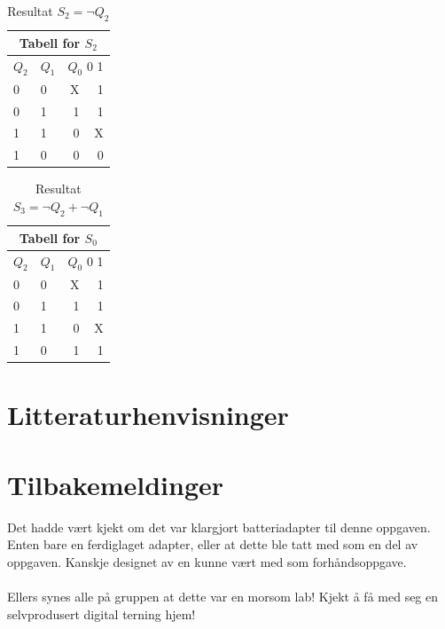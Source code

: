 \documentclass[12pt,norsk,a4paper]{article}
\begin{document}
    \begin{table}[H]
    \begin{center}
    \begin{tabular}{|l|l|r|r|} \hline
    \multicolumn{4}{|c|}{Tabell for $S_2$} \\ \hline
    $Q_2$ & $Q_1$ & \multicolumn{2}{|r|}{$Q_0$ \hspace{20 mm} 0 \hspace{2 mm} 1} \\ \hline
    0 & 0 & \hspace{27 mm} X \cellcolor[gray]{0.8} & \cellcolor[gray]{0.8} 1 \\ \hline 
    0 & 1 & 1 \cellcolor[gray]{0.8} & 1 \cellcolor[gray]{0.8} \\ \hline
    1 & 1 & 0 & X \\ \hline
    1 & 0 & 0 & 0 \\ \hline
    \end{tabular}
    \end{center}
    \caption{Resultat $S_2=\neg Q_2$}
    \end{table}

    \begin{table}[H]
    \begin{center}
    \begin{tabular}{|l|l|r|r|} \hline
    \multicolumn{4}{|c|}{Tabell for $S_0$} \\ \hline
    $Q_2$ & $Q_1$ & \multicolumn{2}{|r|}{$Q_0$ \hspace{20 mm} 0 \hspace{2 mm} 1} \\ \hline
    0 & 0 & \hspace{27 mm} X \cellcolor[gray]{0.8} & \cellcolor[gray]{0.8} 1 \\ \hline 
    0 & 1 & 1 \cellcolor[gray]{0.8} & 1 \cellcolor[gray]{0.8} \\ \hline
    1 & 1 & 0 & X \\ \hline
    1 & 0 & 1 \cellcolor[gray]{0.8} & 1 \cellcolor[gray]{0.8} \\ \hline
    \end{tabular}
    \end{center}
    \caption{Resultat $S_3=\neg Q_2 + \neg Q_1$}
    \end{table}

\clearpage

\section{Litteraturhenvisninger}
\clearpage

\section{Tilbakemeldinger}
Det hadde vært kjekt om det var klargjort batteriadapter til denne oppgaven. Enten bare en ferdiglaget adapter, eller at dette ble tatt med som en del av oppgaven. Kanskje designet av en kunne vært med som forhåndsoppgave.\\
\\
Ellers synes alle på gruppen at dette var en morsom lab! Kjekt å få med seg en selvprodusert digital terning hjem!
\clearpage
\end{document}
